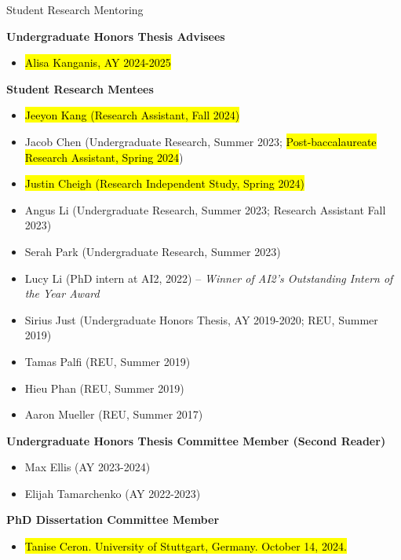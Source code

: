 \documentclass{resume} %
\begin{document}
\begin{rSection}{Student Research Mentoring}

\textbf{Undergraduate Honors Thesis Advisees}
\begin{itemize}[leftmargin=0.5cm]
\item \hl{Alisa Kanganis, AY 2024-2025}
\end{itemize}

\textbf{Student Research Mentees}
\begin{itemize}[leftmargin=0.5cm]
    \item \hl{Jeeyon Kang (Research Assistant, Fall 2024)}
    \item Jacob Chen (Undergraduate Research, Summer 2023; \hl{Post-baccalaureate Research Assistant, Spring 2024})
\item \hl{Justin Cheigh (Research Independent Study, Spring 2024)}
\item Angus Li (Undergraduate Research, Summer 2023; Research Assistant Fall 2023)

\item Serah Park (Undergraduate Research, Summer 2023)
\item Lucy Li (PhD intern at AI2, 2022) -- \emph{Winner of AI2's Outstanding Intern of the Year Award}
\item Sirius Just (Undergraduate Honors Thesis, AY 2019-2020; REU, Summer 2019) 
\item Tamas Palfi (REU, Summer 2019) 
\item Hieu Phan (REU, Summer 2019) 
\item Aaron Mueller (REU, Summer 2017) 
\end{itemize}


\textbf{Undergraduate Honors Thesis Committee Member (Second Reader)}

    \begin{itemize}[leftmargin=0.5cm]
    \item Max Ellis (AY 2023-2024)
    \item Elijah Tamarchenko (AY 2022-2023)
    \end{itemize}

\textbf{PhD Dissertation Committee Member}

\begin{itemize}[leftmargin=0.5cm]
    \item \hl{Tanise Ceron. University of Stuttgart, Germany. October 14, 2024.} 
\end{itemize}

\end{rSection}
\end{document}
